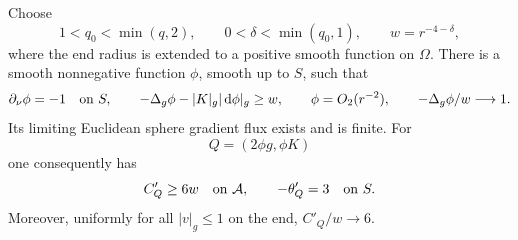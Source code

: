 \begin{lemma}
\label{q4:var:strict-direction}
Choose
\[
 1<q_0<\min(q,2),\qquad 0<\delta<\min(q_0,1),
 \qquad w=r^{-4-\delta},
\]
where the end radius is extended to a positive smooth function on $\Omega$.
There is a smooth nonnegative function $\phi$, smooth up to $S$, such that
\begin{equation}
 \partial_\nu\phi=-1\quad\hbox{on }S,\qquad
 -\Delta_g\phi-|K|_g|\,\mathrm d\phi|_g\ge w,\qquad
 \phi=O_2(r^{-2}),\qquad -\Delta_g\phi/w\longrightarrow1.
\label{q4:var:phi-properties}
\end{equation}
Its limiting Euclidean sphere gradient flux exists and is finite.
For
\[
 Q=(2\phi g,\phi K)
\]
one consequently has
\begin{equation}
 C'_Q\ge6w\quad\hbox{on }\mathcal A,
 \qquad -\theta'_Q=3\quad\hbox{on }S.
\label{q4:var:strict-derivatives}
\end{equation}
Moreover, uniformly for all $|v|_g\le1$ on the end,
$C'_Q/w\longrightarrow6$.
\end{lemma}

